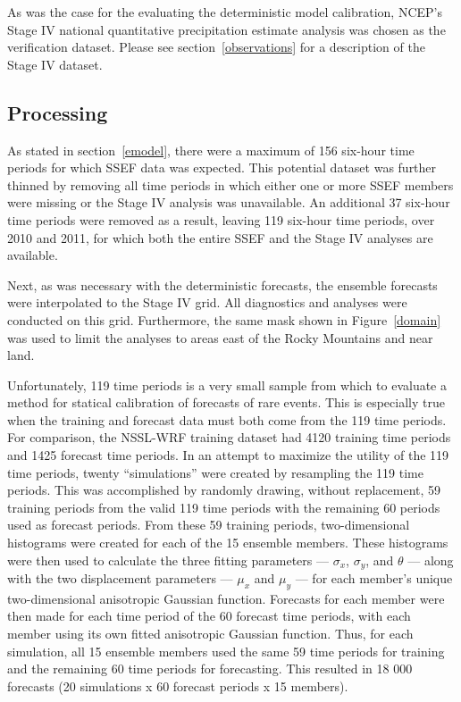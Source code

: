 As was the case for the evaluating the deterministic model calibration, NCEP's Stage IV national quantitative precipitation estimate analysis was chosen as the verification dataset.
Please see \mbox{section \ref{observations}} for a description of the Stage IV dataset.




\subsection{Processing}
\label{eprocessing}

As stated in \mbox{section \ref{emodel}}, there were a maximum of 156 six-hour time periods for which SSEF data was expected.
This potential dataset was further thinned by removing all time periods in which either one or more SSEF members were missing or the Stage IV analysis was unavailable.
An additional 37 six-hour time periods were removed as a result, leaving 119 six-hour time periods, over 2010 and 2011, for which both the entire SSEF and the Stage IV analyses are available.


Next, as was necessary with the deterministic forecasts, the ensemble forecasts were interpolated to the Stage IV grid.
All diagnostics and analyses were conducted on this grid.
Furthermore, the same mask shown in \mbox{Figure \ref{domain}} was used to limit the analyses to areas east of the Rocky Mountains and near land.


Unfortunately, 119 time periods is a very small sample from which to evaluate a method for statical calibration of forecasts of rare events.
This is especially true when the training and forecast data must both come from the 119 time periods.
For comparison, the NSSL-WRF training dataset had 4120 training time periods and 1425 forecast time periods.
In an attempt to maximize the utility of the 119 time periods, twenty ``simulations'' were created by resampling the 119 time periods.
This was accomplished by randomly drawing, without replacement, 59 training periods from the valid 119 time periods with the remaining 60 periods used as forecast periods.
From these 59 training periods, two-dimensional histograms were created for each of the 15 ensemble members.
These histograms were then used to calculate the three fitting parameters --- $\sigma_x$, $\sigma_y$, and $\theta$ --- along with the two displacement parameters --- $\mu_x$ and $\mu_y$ --- for each member's unique two-dimensional anisotropic Gaussian function.
Forecasts for each member were then made for each time period of the 60 forecast time periods, with each member using its own fitted anisotropic Gaussian function.
Thus, for each simulation, all 15 ensemble members used the same 59 time periods for training and the remaining 60 time periods for forecasting.
This resulted in 18 000 forecasts (20 simulations x 60 forecast periods x 15 members).
